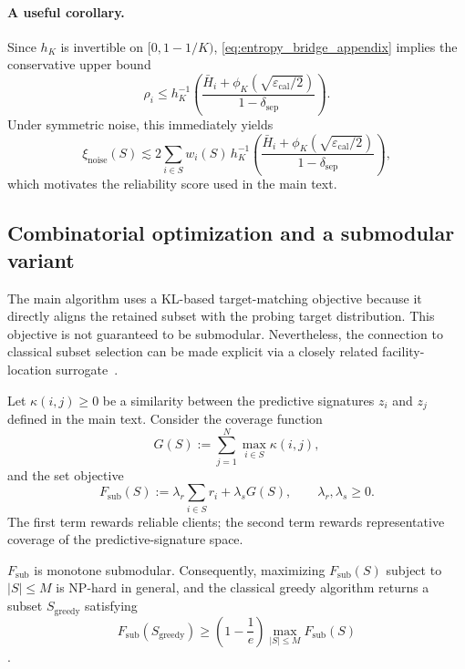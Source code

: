 \paragraph{\textbf{A useful corollary.}}
Since $h_K$ is invertible on $[0,1-1/K)$, \eqref{eq:entropy_bridge_appendix} implies the conservative upper bound
\begin{equation}
\rho_i
\le
h_K^{-1}\!\left(
\frac{\bar H_i+\phi_K(\sqrt{\varepsilon_{\mathrm{cal}}/2})}{1-\delta_{\mathrm{sep}}}
\right).
\end{equation}
Under symmetric noise, this immediately yields
\begin{equation}
\xi_{\mathrm{noise}}(S)
\lesssim
2\sum_{i\in S}w_i(S)
\,h_K^{-1}\!\left(
\frac{\bar H_i+\phi_K(\sqrt{\varepsilon_{\mathrm{cal}}/2})}{1-\delta_{\mathrm{sep}}}
\right),
\end{equation}
which motivates the reliability score used in the main text.

\subsection{Combinatorial optimization and a submodular variant}
\label{app:submodular_variant}

The main algorithm uses a KL-based target-matching objective because it directly aligns the retained subset with the probing target distribution. This objective is not guaranteed to be submodular. Nevertheless, the connection to classical subset selection can be made explicit via a closely related facility-location surrogate~\cite{nemhauser1978submodular,krause2014submodular,sener2018coreset,mirzasoleiman2020coresets_dataefficient_pmlr}.

Let $\kappa(i,j)\ge 0$ be a similarity between the predictive signatures $z_i$ and $z_j$ defined in the main text. Consider the coverage function
\begin{equation}
G(S) := \sum_{j=1}^N \max_{i\in S} \kappa(i,j),
\end{equation}
and the set objective
\begin{equation}
F_{\mathrm{sub}}(S)
:=
\lambda_r\sum_{i\in S} r_i
+ \lambda_s G(S),
\qquad \lambda_r,\lambda_s\ge 0.
\end{equation}
The first term rewards reliable clients; the second term rewards representative coverage of the predictive-signature space.

\begin{proposition}
\label{prop:submodular_appendix}
$F_{\mathrm{sub}}$ is monotone submodular. Consequently, maximizing $F_{\mathrm{sub}}(S)$ subject to $|S|\le M$ is NP-hard in general, and the classical greedy algorithm returns a subset $S_{\mathrm{greedy}}$ satisfying
\begin{equation}
F_{\mathrm{sub}}(S_{\mathrm{greedy}})
\ge
\left(1-\frac{1}{e}\right)
\max_{|S|\le M}F_{\mathrm{sub}}(S)
\end{equation}
\cite{nemhauser1978submodular,krause2014submodular}.
\end{proposition}

